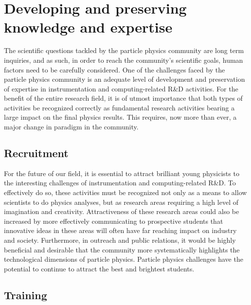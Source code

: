 \section{Developing and preserving knowledge and expertise}


The scientific questions tackled by the particle physics community are long term inquiries, and as such, in order to reach the community's scientific goals, human factors need to be carefully considered.  
One of the challenges faced by the particle physics community is an adequate level of development and preservation of expertise in instrumentation and computing-related R\&D activities.  For the benefit of the entire research field, it is of utmost importance that both types of activities be recognized correctly as fundamental research activities bearing a large impact on the final physics results.  This requires, now more than ever, a major change in paradigm in the community. 


\subsection{Recruitment}

For the future of our field, it is essential to attract brilliant young physicists to the interesting challenges of instrumentation and computing-related R\&D.  To effectively do so, these activities must be recognized not only as a means to allow scientists to do physics analyses, but as research areas requiring a high level of imagination and creativity.  Attractiveness of these research areas could also be increased by more effectively communicating to prospective students that innovative ideas in these areas will often have far reaching impact on industry and society.  Furthermore, in outreach and public relations, it would be highly beneficial and desirable that the community more systematically highlights the technological dimensions of particle physics.  Particle physics challenges have the potential to continue to attract the best and brightest students.


\subsection{Training}

